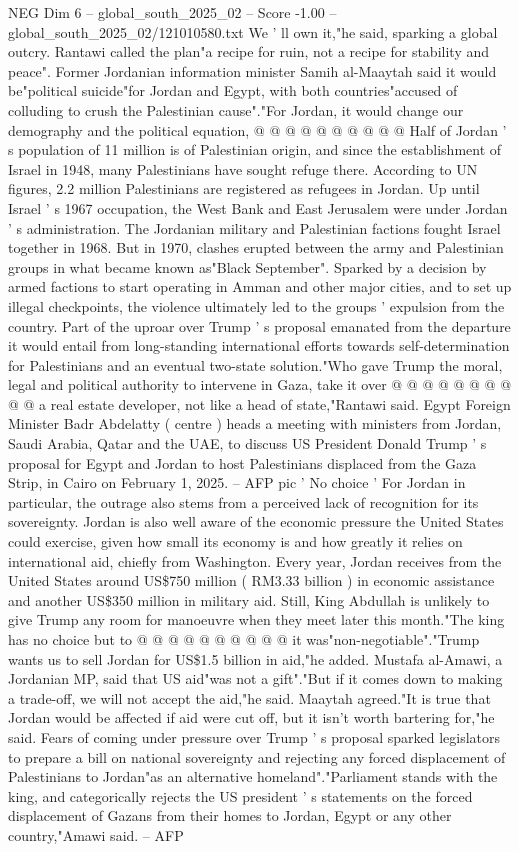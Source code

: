 \begin{textsample}{NEG Dim 6 – global\_south\_2025\_02 – Score -1.00 – global\_south\_2025\_02/121010580.txt}
We ' ll own it,"he said, sparking a global outcry.
Rantawi called the plan"a recipe for ruin, not a recipe for stability and peace".
Former Jordanian information minister Samih al-Maaytah said it would be"political suicide"for Jordan and Egypt, with both countries"accused of colluding to crush the Palestinian cause"."For Jordan, it would change our demography and the political equation, @ @ @ @ @ @ @ @ @ @ Half of Jordan ' s population of 11 million is of Palestinian origin, and since the establishment of Israel in 1948, many Palestinians have sought refuge there.
According to UN figures, 2.2 million Palestinians are registered as refugees in Jordan.
Up until Israel ' s 1967 occupation, the West Bank and East Jerusalem were under Jordan ' s administration.
The Jordanian military and Palestinian factions fought Israel together in 1968.
But in 1970, clashes erupted between the army and Palestinian groups in what became known as"Black September".
Sparked by a decision by armed factions to start operating in Amman and other major cities, and to set up illegal checkpoints, the violence ultimately led to the groups ' expulsion from the country.
Part of the uproar over Trump ' s proposal emanated from the departure it would entail from long-standing international efforts towards self-determination for Palestinians and an eventual two-state solution."Who gave Trump the moral, legal and political authority to intervene in Gaza, take it over @ @ @ @ @ @ @ @ @ @ a real estate developer, not like a head of state,"Rantawi said.
Egypt Foreign Minister Badr Abdelatty ( centre ) heads a meeting with ministers from Jordan, Saudi Arabia, Qatar and the UAE, to discuss US President Donald Trump ' s proposal for Egypt and Jordan to host Palestinians displaced from the Gaza Strip, in Cairo on February 1, 2025. -- AFP pic ' No choice ' For Jordan in particular, the outrage also stems from a perceived lack of recognition for its sovereignty.
Jordan is also well aware of the economic pressure the United States could exercise, given how small its economy is and how greatly it relies on international aid, chiefly from Washington.
Every year, Jordan receives from the United States around US\$750 million ( RM3.33 billion ) in economic assistance and another US\$350 million in military aid.
Still, King Abdullah is unlikely to give Trump any room for manoeuvre when they meet later this month."The king has no choice but to @ @ @ @ @ @ @ @ @ @ it was"non-negotiable"."Trump wants us to sell Jordan for US\$1.5 billion in aid,"he added.
Mustafa al-Amawi, a Jordanian MP, said that US aid"was not a gift"."But if it comes down to making a trade-off, we will not accept the aid,"he said.
Maaytah agreed."It is true that Jordan would be affected if aid were cut off, but it isn't worth bartering for,"he said.
Fears of coming under pressure over Trump ' s proposal sparked legislators to prepare a bill on national sovereignty and rejecting any forced displacement of Palestinians to Jordan"as an alternative homeland"."Parliament stands with the king, and categorically rejects the US president ' s statements on the forced displacement of Gazans from their homes to Jordan, Egypt or any other country,"Amawi said. -- AFP


\end{textsample}
